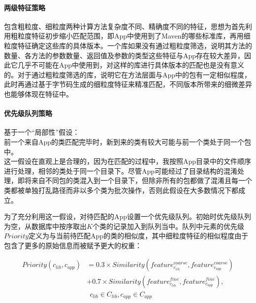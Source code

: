 \paragraph{两级特征策略}包含粗粒度、细粒度两种计算方法复杂度不同、精确度不同的特征，思想为首先利用粗粒度特征初步缩小匹配范围，即App中使用到了Maven的哪些标准库，再用细粒度特征确定这些库的具体版本。一个库如果没有通过粗粒度筛选，说明其方法的数量、各方法的参数数量、返回值及参数的类型这些特征与App存在较大差异，因此它几乎不可能在App中使用到，对这样的库进行具体版本的匹配也是没有意义的。对于通过粗粒度筛选的库，说明它在方法层面与App中的包有一定相似程度，此时再通过基于字节码生成的细粒度特征来精准匹配，不同版本所带来的细微差异也能够体现在特征中。

\paragraph{优先级队列策略}基于一个“局部性”假设：\\{\kaishu 前一个来自App的类匹配完毕时，新到来的类有较大可能与前一个类处于同一个包中}。\\

这一假设在直观上是合理的，因为在匹配的过程中，我按照App目录中的文件顺序进行处理，相邻的类处于同一个目录下。尽管App可能经过了目录结构的混淆处理，即将来自不同包的类混入到一个目录下，但除非所有的包都做了混淆且每一个类都被单独打乱路径而非以多个类为批次操作，否则此假设在大多数情况下都成立。

为了充分利用这一假设，对待匹配的App设置一个优先级队列。初始时优先级队列为空，从数据库中按序取出$K$个类的记录加入到队列当中。队列中元素的优先级$Priority$定义为与当前待匹配App的类的相似度，其中细粒度特征的相似程度由于包含了更多的原始信息而被赋予更大的权重：

\begin{equation}
\begin{aligned}
Priority(c_{lib},c_{app})&=0.3\times Similarity(feature^{coarse}_{c_{lib}},feature^{coarse}_{c_{app}})\\
						 &+0.7\times Similarity(feature^{fine}_{c_{lib}},feature^{fine}_{c_{app}}),\\
						 &\ \ c_{lib}\in C_{lib}, c_{app}\in C_{app}
\end{aligned}
\end{equation}

